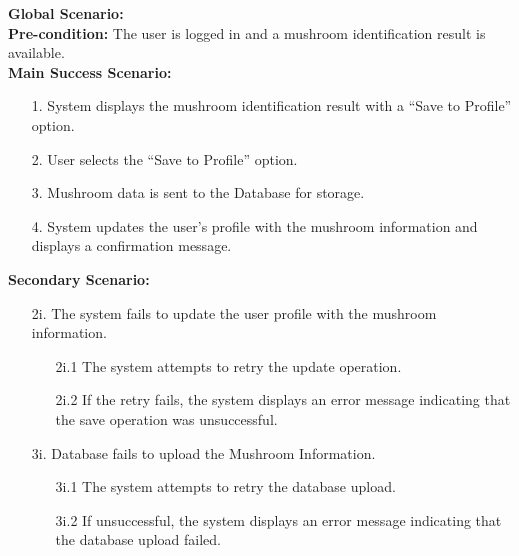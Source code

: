 \documentclass{article}
\begin{document}
\begin{enumerate}[{\bf BE1.}]
	    \textbf{Global Scenario:}\\
	    \textbf{Pre-condition:} The user is logged in and a mushroom identification result is available.\\[1mm]
	    \textbf{Main Success Scenario:}
	    \begin{enumerate}
	        \item[1.] System displays the mushroom identification result with a ``Save to Profile'' option.
	        \item[2.] User selects the ``Save to Profile'' option.
	        \item[3.] Mushroom data is sent to the Database for storage.
	        \item[4.] System updates the user's profile with the mushroom information and displays a confirmation message.
	    \end{enumerate}
	    \textbf{Secondary Scenario:}
	    {
	    \begin{enumerate}
	        \item[2i. ] The system fails to update the user profile with the mushroom information.
	        \begin{enumerate}
	            \item[2i.1] The system attempts to retry the update operation.
	            \item[2i.2] If the retry fails, the system displays an error message indicating that the save operation was unsuccessful. 
	        \end{enumerate}
	        \item[3i.] Database fails to upload the Mushroom Information.
	        \begin{enumerate}
	            \item[3i.1] The system attempts to retry the database upload.
	            \item[3i.2] If unsuccessful, the system displays an error message indicating that the database upload failed.
	        \end{enumerate}
	    \end{enumerate}
	    }


\end{enumerate}
\end{document}

